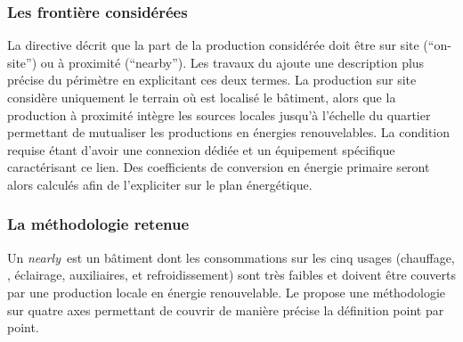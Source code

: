 \subsubsection{Les frontière considérées} %
\label{ssub:les_frontière_considérées}
La directive décrit que la part de la production considérée doit être sur site (\enquote{on-site})
ou à proximité (\enquote{nearby}). Les travaux du  ajoute une description plus précise
du périmètre en explicitant ces deux termes. La production sur site considère uniquement
le terrain où est localisé le bâtiment, alors que la production à proximité intègre
les sources locales jusqu’à l’échelle du quartier permettant de mutualiser les productions
en énergies renouvelables.
La condition requise étant d’avoir une connexion dédiée et un équipement spécifique
caractérisant ce lien. Des coefficients de conversion en énergie primaire seront
alors calculés afin de l’expliciter sur le plan énergétique.​



\subsubsection{La méthodologie retenue} %
\label{ssub:la_methodologie_retenue}
Un \textit{nearly}\, est un bâtiment dont les consommations sur les cinq usages
(chauffage, , éclairage, auxiliaires, et refroidissement)
sont très faibles et doivent être couverts par une production locale en énergie renouvelable.
Le  propose une méthodologie sur quatre axes permettant de couvrir de manière
précise la définition point par point.


